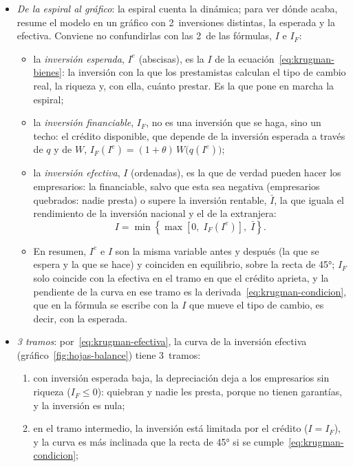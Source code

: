 \documentclass[11pt]{article}
\begin{document}
\begin{itemize}
\item \emph{De la espiral al gráfico}: la espiral cuenta la dinámica; para ver dónde acaba,  resume el modelo en un gráfico con 2~inversiones distintas, la esperada y la efectiva. Conviene no confundirlas con las 2~de las fórmulas, $I$ e $I_F$:
  \begin{itemize}
  \item la \emph{inversión esperada}, $I^e$ (abscisas), es la $I$ de la ecuación~\eqref{eq:krugman-bienes}: la inversión con la que los prestamistas calculan el tipo de cambio real, la riqueza y, con ella, cuánto prestar. Es la que pone en marcha la espiral;
  \item la \emph{inversión financiable}, $I_F$, no es una inversión que se haga, sino un techo: el crédito disponible, que depende de la inversión esperada a través de $q$ y de $W$, $I_F(I^e)=(1+\theta)\,W\bigl(q(I^e)\bigr)$;
  \item la \emph{inversión efectiva}, $I$ (ordenadas), es la que de verdad pueden hacer los empresarios: la financiable, salvo que esta sea negativa (empresarios quebrados: nadie presta) o supere la inversión rentable, $\bar I$, la que iguala el rendimiento de la inversión nacional y el de la extranjera:
    \begin{equation}\label{eq:krugman-efectiva}
    I=\min\left\{\max\left[0,\;I_F(I^e)\right],\;\bar I\right\} .
    \end{equation}
  \item En resumen, $I^e$ e $I$ son la misma variable antes y después (la que se espera y la que se hace) y coinciden en equilibrio, sobre la recta de 45°; $I_F$ solo coincide con la efectiva en el tramo en que el crédito aprieta, y la pendiente de la curva en ese tramo es la derivada~\eqref{eq:krugman-condicion}, que en la fórmula se escribe con la $I$ que mueve el tipo de cambio, es decir, con la esperada.
  \end{itemize}
\item \emph{3 tramos}: por~\eqref{eq:krugman-efectiva}, la curva de la inversión efectiva (gráfico~\ref{fig:hojas-balance}) tiene 3~tramos:
  \begin{enumerate}
  \item con inversión esperada baja, la depreciación deja a los empresarios sin riqueza ($I_F\le0$): quiebran y nadie les presta, porque no tienen garantías, y la inversión es nula;
  \item en el tramo intermedio, la inversión está limitada por el crédito ($I=I_F$), y la curva es más inclinada que la recta de 45° si se cumple~\eqref{eq:krugman-condicion};

\end{enumerate}
\end{itemize}
\end{document}
